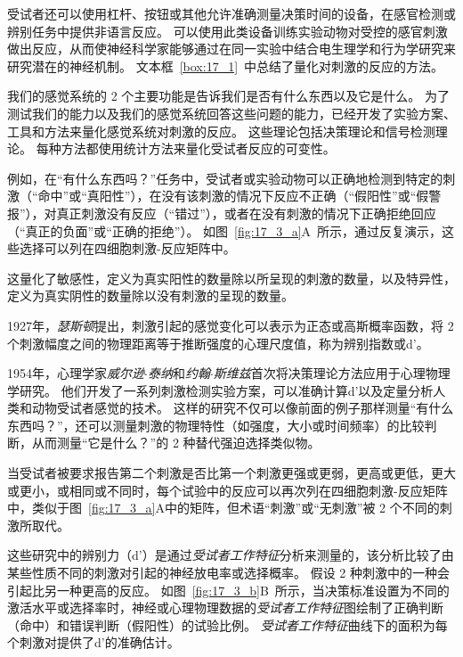 受试者还可以使用杠杆、按钮或其他允许准确测量决策时间的设备，在感官检测或辨别任务中提供非语言反应。 
可以使用此类设备训练实验动物对受控的感官刺激做出反应，从而使神经科学家能够通过在同一实验中结合电生理学和行为学研究来研究潜在的神经机制。
文本框~\ref{box:17_1}~中总结了量化对刺激的反应的方法。


\begin{proposition} \label{box:17_1}
	
	\quad \quad 我们的感觉系统的 2 个主要功能是告诉我们是否有什么东西以及它是什么。
	为了测试我们的能力以及我们的感觉系统回答这些问题的能力，已经开发了实验方案、工具和方法来量化感觉系统对刺激的反应。
	这些理论包括决策理论和信号检测理论。
	每种方法都使用统计方法来量化受试者反应的可变性。
	
	\quad \quad 例如，在“有什么东西吗？”任务中，受试者或实验动物可以正确地检测到特定的刺激（“命中”或“真阳性”），在没有该刺激的情况下反应不正确（“假阳性”或“假警报”），对真正刺激没有反应（“错过”），或者在没有刺激的情况下正确拒绝回应（“真正的负面”或“正确的拒绝”）。
	如图~\ref{fig:17_3_a}A~所示，通过反复演示，这些选择可以列在四细胞刺激-反应矩阵中。
	
	\quad \quad 这量化了敏感性，定义为真实阳性的数量除以所呈现的刺激的数量，以及特异性，定义为真实阴性的数量除以没有刺激的呈现的数量。
	
	\quad \quad 1927年，\textit{瑟斯顿}提出，刺激引起的感觉变化可以表示为正态或高斯概率函数，将 2 个刺激幅度之间的物理距离等于推断强度的心理尺度值，称为辨别指数或d'。
	
	\quad \quad 1954年，心理学家\textit{威尔逊$\cdot$泰纳}和\textit{约翰$\cdot$斯维兹}首次将决策理论方法应用于心理物理学研究。
	他们开发了一系列刺激检测实验方案，可以准确计算d'以及定量分析人类和动物受试者感觉的技术。
	这样的研究不仅可以像前面的例子那样测量“有什么东西吗？”，还可以测量刺激的物理特性（如强度，大小或时间频率）的比较判断，从而测量“它是什么？”的 2 种替代强迫选择类似物。
	
	\quad \quad 当受试者被要求报告第二个刺激是否比第一个刺激更强或更弱，更高或更低，更大或更小，或相同或不同时，每个试验中的反应可以再次列在四细胞刺激-反应矩阵中，类似于图~\ref{fig:17_3_a}A中的矩阵，但术语“刺激”或“无刺激”被 2 个不同的刺激所取代。
	
	\quad \quad 这些研究中的辨别力（d'）是通过\textit{受试者工作特征}分析来测量的，该分析比较了由某些性质不同的刺激对引起的神经放电率或选择概率。
	假设 2 种刺激中的一种会引起比另一种更高的反应。
	如图~\ref{fig:17_3_b}B~所示，当决策标准设置为不同的激活水平或选择率时，神经或心理物理数据的\textit{受试者工作特征}图绘制了正确判断（命中）和错误判断（假阳性）的试验比例。
	\textit{受试者工作特征}曲线下的面积为每个刺激对提供了d'的准确估计。
	

\end{proposition}
